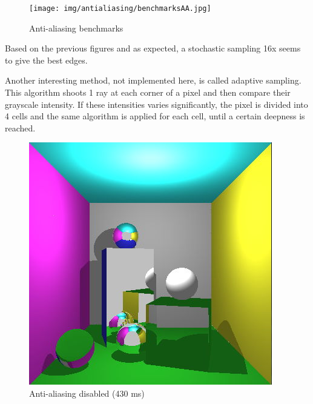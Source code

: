 \begin{figure}[H]
\centering
\texttt{[image: img/antialiasing/benchmarksAA.jpg]}
\caption{Anti-aliasing benchmarks}
\end{figure}


Based on the previous figures and as expected, a stochastic sampling 16x seems to give the best edges.

Another interesting method, not implemented here, is called adaptive sampling. This algorithm shoots 1 ray at each corner of a pixel and then compare their grayscale intensity. If these intensities varies significantly, the pixel is divided into 4 cells and the same algorithm is applied for each cell, until a certain deepness is reached.

\begin{figure}[H]
\centering
{}
    \centering
    \includegraphics[width=\linewidth]{img/glass_refraction.jpg}
    \caption{Anti-aliasing disabled (430 ms)}
\endminipage
{}
    \centering

\end{figure}
